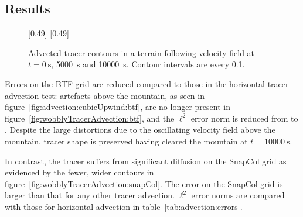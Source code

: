 \subsection{Results}

\begin{figure}
	\captionsetup[subfigure]{position=b}
	\centering
	[0.49\textwidth]{}
	\hfill
	[0.49\textwidth]{}
%
	\caption{Advected tracer contours in a terrain following velocity field at $t = \SI{0}{\second}$, \SI{5000}{\second} and \SI{10000}{\second}.  Contour intervals are every 0.1.}
\end{figure}

Errors on the BTF grid are reduced compared to those in the horizontal tracer advection test: artefacts above the mountain, as seen in figure~\ref{fig:advection:cubicUpwind:btf}, are no longer present in figure~\ref{fig:wobblyTracerAdvection:btf}, and the $\ell^2$ error norm is reduced from  to \unskip.  Despite the large distortions due to the oscillating velocity field above the mountain, tracer shape is preserved having cleared the mountain at $t = \SI{10000}{\second}$.

In contrast, the tracer suffers from significant diffusion on the SnapCol grid as evidenced by the fewer, wider contours in figure~\ref{fig:wobblyTracerAdvection:snapCol}.  The error on the SnapCol grid is larger than that for any other tracer advection.  $\ell^2$ error norms are compared with those for horizontal advection in table~\ref{tab:advection:errors}.

